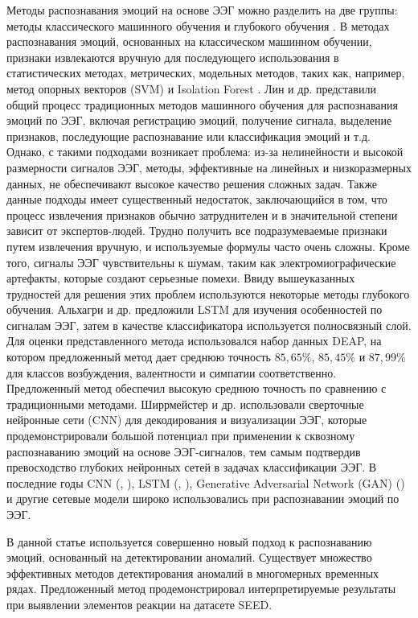 \documentclass{article}
\begin{document}
Методы распознавания эмоций на основе ЭЭГ можно разделить на две группы: методы классического машинного обучения и глубокого обучения \citep{sensors18}. В методах распознавания эмоций, основанных на классическом машинном обучении, признаки извлекаются вручную для последующего использования в статистических методах, метрических, модельных методов, таких как, например, метод опорных векторов (SVM) \citet{scholkopfsuppor} и Isolation Forest \citet{liu2008isolation}. Лин и др. \citet{sensors18} представили общий процесс традиционных методов машинного обучения для распознавания эмоций по ЭЭГ, включая регистрацию эмоций, получение сигнала, выделение признаков, последующие распознавание или классификация эмоций и т.д. Однако, с такими подходами возникает проблема: из-за нелинейности и высокой размерности сигналов ЭЭГ, методы, эффективные на линейных и низкоразмерных данных, не обеспечивают высокое качество решения сложных задач. Также данные подходы имеет существенный недостаток, заключающийся в том, что процесс извлечения признаков обычно затруднителен и в значительной степени зависит от экспертов-людей. Трудно получить все подразумеваемые признаки путем извлечения вручную, и используемые формулы часто очень сложны. Кроме того, сигналы ЭЭГ чувствительны к шумам, таким как электромиографические артефакты, которые создают серьезные помехи. Ввиду вышеуказанных трудностей для решения этих проблем используются некоторые методы глубокого обучения. Альхагри и др. \citep{lstm} предложили LSTM для изучения особенностей по сигналам ЭЭГ, затем в качестве классификатора используется полносвязный слой. Для оценки представленного метода использовался набор данных DEAP, на котором предложенный метод дает среднюю точность $85,65\%$, $85,45\%$ и $87,99\%$ для классов возбуждения, валентности и симпатии соответственно. Предложенный метод обеспечил высокую среднюю точность по сравнению с традиционными методами. Ширрмейстер и др. \citep{cnn} использовали сверточные нейронные сети (CNN) для декодирования и визуализации ЭЭГ, которые продемонстрировали большой потенциал при применении к сквозному распознаванию эмоций на основе ЭЭГ-сигналов, тем самым подтвердив превосходство глубоких нейронных сетей в задачах классификации ЭЭГ. В последние годы CNN (\citep{sensors_cnn}, \citep{med_cnn}), LSTM (\citep{lstm}, \citep{sharma}), Generative Adversarial Network (GAN) (\citep{gan}) и другие сетевые модели широко использовались при распознавании эмоций по ЭЭГ.

В данной статье используется совершенно новый подход к распознаванию эмоций, основанный на детектировании аномалий. Существует множество эффективных методов детектирования аномалий в многомерных временных рядах. Предложенный метод продемонстрировал интерпретируемые результаты при выявлении элементов реакции на датасете SEED\citep{seed}.
\end{document}
